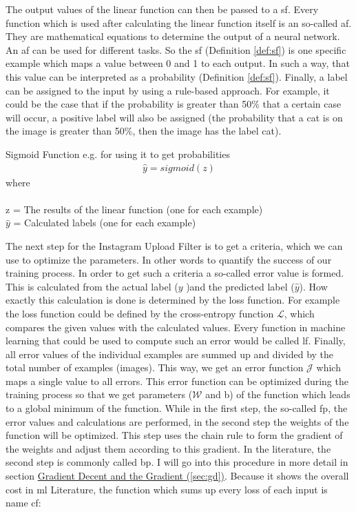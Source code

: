 The output values of the linear function can then be passed to a \Gls{sf}. Every function which is used after calculating the linear function itself is an so-called \Gls{af}. They are mathematical equations to determine the output of a neural network. An \Gls{af} can be used for different tasks. So the \gls{sf} (Definition \ref{def:sf}) is one specific example which maps a value between 0 and 1 to each output. In such a way, that this value can be interpreted as a probability (Definition \ref{def:sf}). Finally, a label can be assigned to the input by using a rule-based approach. For example, it could be the case that if the probability is greater than 50\% that a certain case will occur, a positive label will also be assigned (the probability that a cat is on the image is greater than 50\%, then the image has the label cat).\\

\begin{definition}[label=def:sf]{Sigmoid Function e.g. for using it to get probabilities}
	\begin{align*}
	\hat{y} = sigmoid(z)
	\end{align*}
	where \\\\
	z = The results of the linear function (one for each example)\\
	\( \hat{y}\) = Calculated labels (one for each example) \\
\end{definition}

The next step for the Instagram Upload Filter is to get a criteria, which we can use to optimize the parameters. In other words to quantify the success of our training process. In order to get such a criteria a so-called error value is formed. This is calculated from the actual label (\(y\) )and the predicted label (\( \hat{y} \)). How exactly this calculation is done is determined by the loss function. For example the loss function could be defined by the cross-entropy function \(\mathcal{L}\), which compares the given values with the calculated values. Every function in machine learning that could be used to compute such an error would be called \Gls{lf}. Finally, all error values of the individual examples are summed up and divided by the total number of examples (images). This way, we get an error function \(\mathcal{J}\) which maps a single value to all errors. This error function can be optimized during the training process so that we get parameters (\(\mathcal{W} \) and b) of the function which leads to a global minimum of the function. While in the first step, the so-called \gls{fp}, the error values and calculations are performed, in the second step the weights of the function will be optimized. This step uses the chain rule to form the gradient of the weights and adjust them according to this gradient. In the literature, the second step is commonly called \gls{bp}. I will go into this procedure in more detail in section  \hyperref[sec:gd]{Gradient Decent and the Gradient (\ref{sec:gd})}. Because it shows the overall cost in \Gls{ml} Literature, the function which sums up every loss of each input is name \Gls{cf}:

